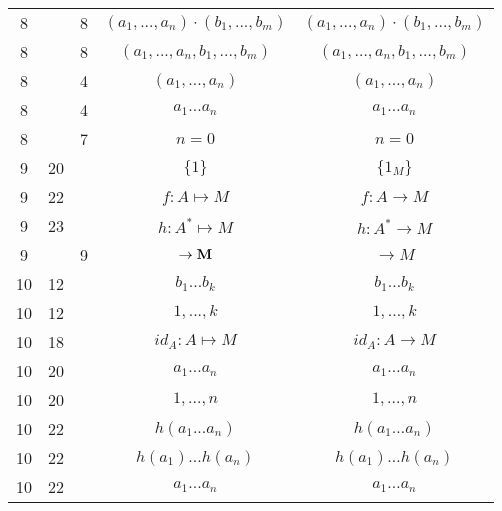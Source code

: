 \documentclass[a4paper,11pt]{article}
\begin{document}
\begin{center}
\begin{tabular}{|c|c|c|c|c|}
    8  & &  8 & $( a_{ 1 }, ..., a_{ n } ) \cdot ( b_{ 1 }, ..., b_{ m } )$
           & $( a_{ 1 }, \ldots, a_{ n } ) \cdot ( b_{ 1 }, \ldots, b_{ m } )$ \\
    8  & &  8 & $( a_{ 1 }, ..., a_{ n }, b_{ 1 }, ..., b_{ m } )$
           & $( a_{ 1 }, \ldots, a_{ n }, b_{ 1 }, \ldots, b_{ m } )$ \\
    8  & &  4 & $( a_{ 1 }, ..., a_{ n } )$ & $( a_{ 1 }, \ldots, a_{ n } )$ \\
    8  & &  4 & $a_{ 1 } ... a_{ n }$ & $a_{ 1 } \ldots a_{ n }$ \\
    8  & &  7 & $n \!\! = \!\! 0$ & $n = 0$ \\
    9  & 20 & & $\{ 1 \}$ & $\{ 1_{ M } \}$ \\
    9  & 22 & & $f : A \mapsto M$ & $f : A \to M$ \\
    9  & 23 & & $h : A^{ * } \mapsto M$ & $h : A^{ * } \to M$ \\
    9  & &  9 & $\to \textrm{\textbf{M}}$ & $\to M$ \\
    10 & 12 & & $b_{ 1 } ... b_{ k }$ & $b_{ 1 } \ldots b_{ k }$ \\
    10 & 12 & & $1, ..., k$ & $1, \ldots, k$ \\
    10 & 18 & & $id_{ A } : A \mapsto M$ & $id_{ A } : A \to M$ \\
    10 & 20 & & $a_{ 1 } ... a_{ n }$ & $a_{ 1 } \ldots a_{ n }$ \\
    10 & 20 & & $1, ..., n$ & $1, \ldots, n$ \\
    10 & 22 & & $h( a_{ 1 } ... a_{ n } )$ & $h( a_{ 1 } \ldots a_{ n } )$ \\
    10 & 22 & & $h( a_{ 1 } ) ... h( a_{ n } )$
           & $h( a_{ 1 } ) \ldots h( a_{ n } )$ \\
    10 & 22 & & $a_{ 1 } ... a_{ n }$ & $a_{ 1 } \ldots a_{ n }$ \\
    \hline
  \end{tabular}





  \newpage


\end{center}
\end{document}

